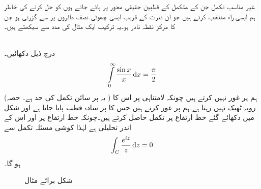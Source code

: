 غیر مناسب تکمل جن کے متکمل کے قطبین حقیقی محور پر پائے جاتے ہوں کو حل کرنے کی خاطر ہم ایسی راہ منتخب کرتے ہیں جو ان ندرت کے قریب ایسی چھوٹی نصف دائروں پر سے گزرتی ہو جن کا مرکز نقطہ نادر ہو۔یہ ترکیب ایک مثال کی مدد سے سیکھتے ہیں۔

\quad {}\\
درج ذیل دکھائیں۔
\begin{align*}
\int\limits_{0}^{\infty}\frac{\sin x}{x}\dif x=\frac{\pi}{2}
\end{align*}
(یہ  پر سائن تکمل  کی حد ہے۔ حصہ ) ہم  پر غور نہیں کرتے ہیں چونکہ لامتناہی پر اس کا رویہ ٹھیک نہیں رہتا ہے۔ہم  پر غور کرتے ہیں جس کا  پر سادہ قطب پایا جاتا ہے اور شکل  میں دکھائے گئے خط ارتفاع  پر تکمل حاصل کرتے ہیں۔چونکہ  خط ارتفاع  پر اور اس کے اندر تحلیلی ہے لہٰذا کوشی مسئلہ تکمل سے
\begin{align}\label{مساوات_بقیہ_مثال_کوشی_الف}
\int_C \frac{e^{iz}}{z}\dif z=0
\end{align}
ہو گا۔
\begin{figure}
\centering
{}
\caption{شکل برائے مثال }
\label{شکل_مثال_بقیہ_غیر_مناسب_ب}
\end{figure}


